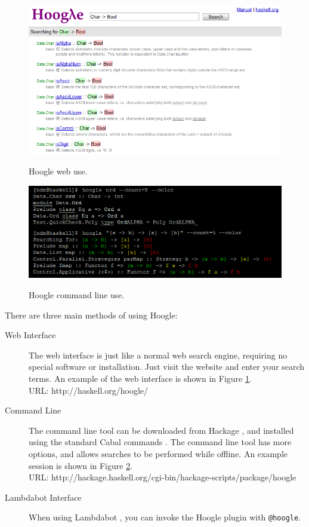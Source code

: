 \documentclass{tmr}
\begin{document}
\begin{figure}
\ifpdf\includegraphics[width=\textwidth]{web.png}\fi
\label{fig:web}
\caption{Hoogle web use.}
\end{figure}

\begin{figure}
\ifpdf\includegraphics[width=\textwidth]{cmdline.png}\fi
\label{fig:cmdline}
\caption{Hoogle command line use.}
\end{figure}

There are three main methods of using Hoogle:

\begin{description}
\item[Web Interface] The web interface is just like a normal web search engine, requiring no special software or installation. Just visit the website and enter your search terms. An example of the web interface is shown in Figure \ref{fig:web}. \\
    URL: \textsf{http://haskell.org/hoogle/}
\item[Command Line] The command line tool can be downloaded from Hackage \cite{hackage}, and installed using the standard Cabal commands \cite{cabal}. The command line tool has more options, and allows searches to be performed while offline. An example session is shown in Figure \ref{fig:cmdline}. \\
    URL: \textsf{http://hackage.haskell.org/cgi-bin/hackage-scripts/package/hoogle} 
\item[Lambdabot Interface] When using Lambdabot \cite{lambdabot}, you can invoke the Hoogle plugin with \texttt{@hoogle}.
\end{description}
\end{document}
